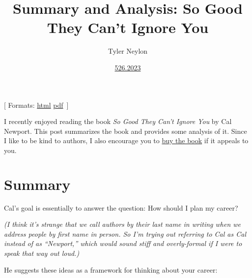 \documentclass[
]{article}
\title{Summary and Analysis: So Good They Can't Ignore You}
\author{Tyler Neylon}
\date{\href{https://tylerneylon.com/a/7date/}{526.2023}}
\newcommand{\class}[1]{}
\newcommand{\optquad}{\quad}
\newcommand{\smallscrneg}{}
\newcommand{\smallscr}[1]{}
\newcommand{\bigscr}[1]{#1}
\newcommand{\smallscrskip}[1]{}
\begin{document}
\maketitle

\newcommand{\R}{\mathbb{R}}
\newcommand{\N}{\mathbb{N}}
\newcommand{\eqnset}[1]{\left.\mbox{$#1$}\;\;\right\rbrace\class{postbrace}{ }}
\providecommand{\latexonlyrule}[3][]{}
\providecommand{\optquad}{\class{optquad}{}}
\providecommand{\smallscrneg}{\class{smallscrneg}{ }}
\providecommand{\bigscr}[1]{\class{bigscr}{#1}}
\providecommand{\smallscr}[1]{\class{smallscr}{#1}}
\providecommand{\smallscrskip}[1]{\class{smallscrskip}{\hskip #1}}

\newcommand{\mydots}{{\cdot}\kern -0.1pt{\cdot}\kern -0.1pt{\cdot}}

\newcommand{\?}{\stackrel{?}{=}}
\newcommand{\sign}{\textsf{sign}}
\newcommand{\order}{\textsf{order}}
\newcommand{\flips}{\textsf{flips}}
\newcommand{\samecycles}{\textsf{same$\\\_$cycles}}
\newcommand{\canon}{\textsf{canon}}
\newcommand{\cs}{\mathsf{cs}}
\newcommand{\dist}{\mathsf{dist}}
\renewcommand{\theenumi}{(\roman{enumi})}

{[} Formats:
\href{http://tylerneylon.com/b/newport_book/newport_book.html}{html}
\textbar{}
\href{http://tylerneylon.com/b/newport_book/newport_book.pdf}{pdf}
\(\,\){]}

I recently enjoyed reading the book \emph{So Good They Can't Ignore You}
by Cal Newport. This post summarizes the book and provides some analysis
of it. Since I like to be kind to authors, I also encourage you to
\href{https://www.amazon.com/So-Good-They-Cant-Ignore-You-audiobook/dp/B009CMO8JQ/}{buy
the book} if it appeals to you.

\hypertarget{summary}{%
\section{Summary}\label{summary}}

Cal's goal is essentially to answer the question: How should I plan my
career?

\emph{(I think it's strange that we call authors by their last name in
writing when we address people by first name in person. So I'm trying
out referring to Cal as Cal instead of as ``Newport,'' which would sound
stiff and overly-formal if I were to speak that way out loud.)}

He suggests these ideas as a framework for thinking about your career:
\end{document}
